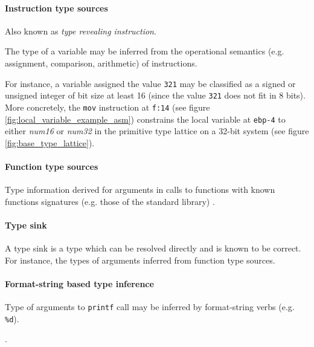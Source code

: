 
\paragraph{Instruction type sources}

Also known as \textit{type revealing instruction}.

The type of a variable may be inferred from the operational semantics (e.g. assignment, comparison, arithmetic) of instructions.

For instance, a variable assigned the value \texttt{321} may be classified as a signed or unsigned integer of bit size at least 16 (since the value \texttt{321} does not fit in 8 bits). More concretely, the \texttt{mov} instruction at \texttt{f:14} (see figure \ref{fig:local_variable_example_asm}) constrains the local variable at \texttt{ebp-4} to either \textit{num16} or \textit{num32} in the primitive type lattice on a 32-bit system (see figure \ref{fig:base_type_lattice}).




\paragraph{Function type sources}

Type information derived for arguments in calls to functions with known functions signatures (e.g. those of the standard library) \cite{type_inference_on_executables}.


\paragraph{Type sink}

A type sink is a type which can be resolved directly and is known to be correct. For instance, the types of arguments inferred from function type sources.


\paragraph{Format-string based type inference}


Type of arguments to \texttt{printf} call may be inferred by format-string verbs (e.g. \texttt{\%d}).

.

